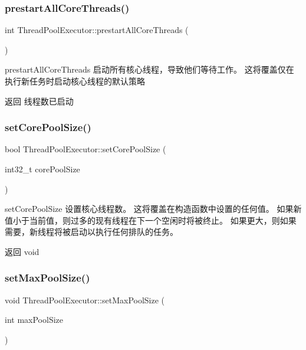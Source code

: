\subsubsection{\texorpdfstring{prestart\+All\+Core\+Threads()}{prestartAllCoreThreads()}}
{\footnotesize\ttfamily int Thread\+Pool\+Executor\+::prestart\+All\+Core\+Threads (\begin{DoxyParamCaption}{ }\end{DoxyParamCaption})}



prestart\+All\+Core\+Threads 启动所有核心线程，导致他们等待工作。 这将覆盖仅在执行新任务时启动核心线程的默认策略 

\begin{DoxyReturn}{返回}
线程数已启动 
\end{DoxyReturn}
\mbox{\label{classThreadPoolExecutor_aaada9deadf7c0f72bca5076deaa8c92f}} 
\subsubsection{\texorpdfstring{set\+Core\+Pool\+Size()}{setCorePoolSize()}}
{\footnotesize\ttfamily bool Thread\+Pool\+Executor\+::set\+Core\+Pool\+Size (\begin{DoxyParamCaption}\item[{int32\+\_\+t}]{core\+Pool\+Size }\end{DoxyParamCaption})}



set\+Core\+Pool\+Size 设置核心线程数。 这将覆盖在构造函数中设置的任何值。 如果新值小于当前值，则过多的现有线程在下一个空闲时将被终止。 如果更大，则如果需要，新线程将被启动以执行任何排队的任务。 

\begin{DoxyReturn}{返回}
void 
\end{DoxyReturn}
\mbox{\label{classThreadPoolExecutor_a83e9e3715fdacc5b2f08b563d39bb62b}} 
\subsubsection{\texorpdfstring{set\+Max\+Pool\+Size()}{setMaxPoolSize()}}
{\footnotesize\ttfamily void Thread\+Pool\+Executor\+::set\+Max\+Pool\+Size (\begin{DoxyParamCaption}\item[{int}]{max\+Pool\+Size }\end{DoxyParamCaption})}



